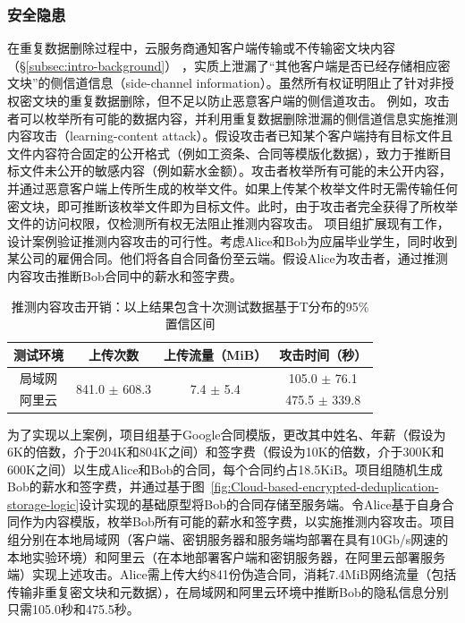 \subsubsection{安全隐患} 
\label{subsec:intro-problem-security}

在重复数据删除过程中，云服务商通知客户端传输或不传输密文块内容（\S\ref{subsec:intro-background}） ，实质上泄漏了“其他客户端是否已经存储相应密文块”的侧信道信息（side-channel information）。虽然所有权证明阻止了针对非授权密文块的重复数据删除，但不足以防止恶意客户端的侧信道攻击。
例如，攻击者可以枚举所有可能的数据内容，并利用重复数据删除泄漏的侧信道信息实施推测内容攻击（learning-content attack）\cite{harnik10,zuo2018mitigating}。假设攻击者已知某个客户端持有目标文件且文件内容符合固定的公开格式（例如工资条、合同等模版化数据），致力于推断目标文件未公开的敏感内容（例如薪水金额）。攻击者枚举所有可能的未公开内容，并通过恶意客户端上传所生成的枚举文件。如果上传某个枚举文件时无需传输任何密文块，即可推断该枚举文件即为目标文件。此时，由于攻击者完全获得了所枚举文件的访问权限，仅检测所有权无法阻止推测内容攻击。
项目组扩展现有工作\cite{harnik10,zuo2018mitigating}，设计案例验证推测内容攻击的可行性。考虑Alice和Bob为应届毕业学生，同时收到某公司的雇佣合同。他们将各自合同备份至云端。假设Alice为攻击者，通过推测内容攻击推断Bob合同中的薪水和签字费。

\begin{table}[!htb]
    \small
    \centering
    \begin{tabular}{@{}cccc@{}}
    \toprule
    测试环境 & 上传次数                            & 上传流量（MiB）                       & 攻击时间（秒）        \\ \midrule
    局域网  & \multirow{2}{*}{841.0 $\pm$ 608.3} & \multirow{2}{*}{7.4 $\pm$ 5.4} & 105.0 $\pm$ 76.1 \\
    阿里云  &                                 &                                 & 475.5 $\pm$ 339.8 \\
    \bottomrule
    \end{tabular}
    \caption{推测内容攻击开销：以上结果包含十次测试数据基于T分布的95\%置信区间}
    \label{tab:intro-bottleneck}
\end{table}

为了实现以上案例，项目组基于Google合同模版\cite{GoogleOffer}，更改其中姓名、年薪（假设为6K的倍数\cite{harnik10}，介于204K和804K之间）和签字费（假设为10K的倍数，介于300K和600K之间）以生成Alice和Bob的合同，每个合同约占18.5KiB。项目组随机生成Bob的薪水和签字费，并通过基于图~\ref{fig:Cloud-based-encrypted-deduplication-storage-logic}设计实现的基础原型将Bob的合同存储至服务端。令Alice基于自身合同作为内容模版，枚举Bob所有可能的薪水和签字费，以实施推测内容攻击。项目组分别在本地局域网（客户端、密钥服务器和服务端均部署在具有10Gb/s网速的本地实验环境）和阿里云（在本地部署客户端和密钥服务器，在阿里云部署服务端）实现上述攻击。Alice需上传大约841份伪造合同，消耗7.4MiB网络流量（包括传输非重复密文块和元数据），在局域网和阿里云环境中推断Bob的隐私信息分别只需105.0秒和475.5秒。

